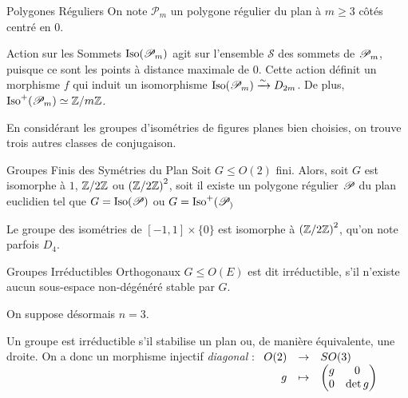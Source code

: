 \documentclass{cours}
\begin{document}
\begin{définition}{Polygones Réguliers}{}
    On note $\mathscr{P}_{m}$ un polygone régulier du plan à $m \geq 3$ côtés centré en $0$.
\end{définition}

\begin{propositionfr}{Action sur les Sommets}{}
    $\text{Iso}(\mathscr{P}_{m})$ agit sur l'ensemble $\mathscr{S}$ des sommets de $\mathscr{P}_{m}$, puisque ce sont les points à distance maximale de $0$. 
    Cette action définit un morphisme $f$ qui induit un isomorphisme $\text{Iso}(\mathscr{P}_{m}) \xrightarrow{\sim} D_{2m}$. De plus, $\text{Iso}^{+}(\mathscr{P}_{m}) \simeq \mathbb{Z}/m\mathbb{Z}$.
\end{propositionfr}

En considérant les groupes d'isométries de figures planes bien choisies, on trouve trois autres classes de conjugaison.

\begin{propositionfr}{Groupes Finis des Symétries du Plan}{}
    Soit $G \leq O(2)$ fini. Alors, soit $G$ est isomorphe à $1$, $\mathbb{Z}/2\mathbb{Z}$ ou $\left(\mathbb{Z}/2\mathbb{Z}\right)^{2}$, soit il existe un polygone régulier $\mathscr{P}_{}$ du plan euclidien tel que $G = \text{Iso}(\mathscr{P}_{})$ ou $G = \text{Iso}^{+}(\mathscr{P}_{)}$
\end{propositionfr}
\begin{remark}
    Le groupe des isométries de $\left[-1, 1\right] \times \{0\}$ est isomorphe à $\left(\mathbb{Z}/2\mathbb{Z}\right)^{2}$, qu'on note parfois $D_{4}$.
\end{remark}

\begin{définition}{Groupes Irréductibles Orthogonaux}{}
    $G \leq O(E)$ est dit irréductible, s'il n'existe aucun sous-espace non-dégénéré stable par $G$.
\end{définition}

On suppose désormais $n = 3$.

\begin{remark}
    Un groupe est irréductible s'il stabilise un plan ou, de manière équivalente, une droite. On a donc un morphisme injectif \emph{diagonal} :
    $\begin{array}[t]{rcl} O(2) & \to & SO(3) \\ g & \mapsto & \begin{pmatrix}g & 0\\ 0 & \det g\end{pmatrix} \end{array}$
\end{remark}
\end{document}
